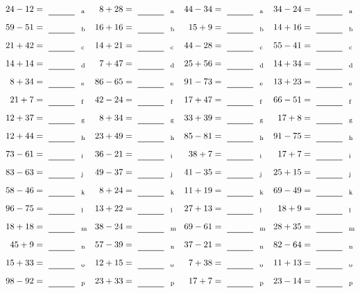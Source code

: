 \documentclass
[
  draft    = true,
  fontsize = 11pt,
  parskip  = half-
]
{scrartcl}
\begin{document}
\clearpage
\begin{align*}
    \pline{24-12}&=\rline{a}
  & \pline{8+28}&=\rline{a}
  & \pline{44-34}&=\rline{a}
  & \pline{34-24}&=\rline{a} \\[1ex]
    \pline{59-51}&=\rline{b}
  & \pline{16+16}&=\rline{b}
  & \pline{15+9}&=\rline{b}
  & \pline{14+16}&=\rline{b} \\[1ex]
    \pline{21+42}&=\rline{c}
  & \pline{14+21}&=\rline{c}
  & \pline{44-28}&=\rline{c}
  & \pline{55-41}&=\rline{c} \\[1ex]
    \pline{14+14}&=\rline{d}
  & \pline{7+47}&=\rline{d}
  & \pline{25+56}&=\rline{d}
  & \pline{14+34}&=\rline{d} \\[1ex]
    \pline{8+34}&=\rline{e}
  & \pline{86-65}&=\rline{e}
  & \pline{91-73}&=\rline{e}
  & \pline{13+23}&=\rline{e} \\[1ex]
    \pline{21+7}&=\rline{f}
  & \pline{42-24}&=\rline{f}
  & \pline{17+47}&=\rline{f}
  & \pline{66-51}&=\rline{f} \\[1ex]
    \pline{12+37}&=\rline{g}
  & \pline{8+34}&=\rline{g}
  & \pline{33+39}&=\rline{g}
  & \pline{17+8}&=\rline{g} \\[1ex]
    \pline{12+44}&=\rline{h}
  & \pline{23+49}&=\rline{h}
  & \pline{85-81}&=\rline{h}
  & \pline{91-75}&=\rline{h} \\[1ex]
    \pline{73-61}&=\rline{i}
  & \pline{36-21}&=\rline{i}
  & \pline{38+7}&=\rline{i}
  & \pline{17+7}&=\rline{i} \\[1ex]
    \pline{83-63}&=\rline{j}
  & \pline{49-37}&=\rline{j}
  & \pline{41-35}&=\rline{j}
  & \pline{25+15}&=\rline{j} \\[1ex]
    \pline{58-46}&=\rline{k}
  & \pline{8+24}&=\rline{k}
  & \pline{11+19}&=\rline{k}
  & \pline{69-49}&=\rline{k} \\[1ex]
    \pline{96-75}&=\rline{l}
  & \pline{13+22}&=\rline{l}
  & \pline{27+13}&=\rline{l}
  & \pline{18+9}&=\rline{l} \\[1ex]
    \pline{18+18}&=\rline{m}
  & \pline{38-24}&=\rline{m}
  & \pline{69-61}&=\rline{m}
  & \pline{28+35}&=\rline{m} \\[1ex]
    \pline{45+9}&=\rline{n}
  & \pline{57-39}&=\rline{n}
  & \pline{37-21}&=\rline{n}
  & \pline{82-64}&=\rline{n} \\[1ex]
    \pline{15+33}&=\rline{o}
  & \pline{12+15}&=\rline{o}
  & \pline{7+38}&=\rline{o}
  & \pline{11+13}&=\rline{o} \\[1ex]
    \pline{98-92}&=\rline{p}
  & \pline{23+33}&=\rline{p}
  & \pline{17+7}&=\rline{p}
  & \pline{23-14}&=\rline{p}
\end{align*}
\end{document}
